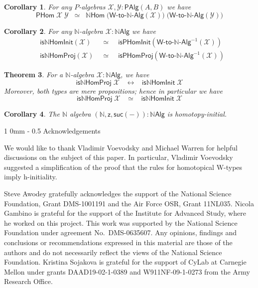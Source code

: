 \documentclass[10pt,a4paper,oneside,reqno]{amsart}
\makeatletter
\numberwithin{equation}{section}
\renewcommand{\section}{\@startsection
  {section}%
   {1}%
  {0mm}%
   {-\baselineskip}%
  {0.5\baselineskip}%
   {\Large\bfseries}}%
\theoremstyle{mythm}
\newtheorem{theorem}{Theorem}[section]
\newtheorem{corollary}[theorem]{Corollary}
\theoremstyle{mydef}
\theoremstyle{myrmk}
\newcommand{\nat}{\ensuremath{\mathbb{N}}}
\newcommand{\suc}{\mathsf{suc}}
\newcommand{\W}{\mathsf{W}}
\newcommand{\NatAlg}{\nat\mathsf{Alg}}
\newcommand{\NatHom}{\nat\mathsf{Hom}}
\newcommand{\IsNatHInit}{\mathsf{is}\nat\mathsf{HomInit}}
\newcommand{\IsNatHProj}{\mathsf{is}\nat\mathsf{HomProj}}
\newcommand{\WAlgToNatAlg}{\W\text{-}\mathsf{to}\text{-}\nat\text{-}\mathsf{Alg}}
\newcommand{\WAlg}{\mathsf{PAlg}}
\newcommand{\WHom}{\mathsf{PHom}}
\newcommand{\IsWHInit}{\mathsf{isPHomInit}}
\newcommand{\IsWHProj}{\mathsf{isPHomProj}}
\newcommand{\X}{\mathcal{X}}
\newcommand{\Y}{\mathcal{Y}}
\newcommand{\z}{\mathsf{z}}
\makeatother
\begin{document}
\begin{corollary}
For any $P$-algebras $\X,\Y : \WAlg(A,B)$ we have
\[ \WHom \; \X \; \Y \;\; \simeq \;\; \NatHom \; \big(\WAlgToNatAlg(\X)\big) \; \big(\WAlgToNatAlg(\Y)\big) \]
\end{corollary}

\begin{corollary}
For any $\nat$-algebra $\X : \NatAlg$ we have
\begin{alignat*}{4}
& \IsNatHInit(\X) \;\; & \simeq \;\; & \IsWHInit(\WAlgToNatAlg^{-1}(\X)) \\
& \IsNatHProj(\X) \;\; & \simeq \;\; & \IsWHProj(\WAlgToNatAlg^{-1}(\X))
\end{alignat*}
\end{corollary}

\begin{theorem}\label{lem:WMainInternal}
For a $\nat$-algebra $\X : \NatAlg$, we have
\[ \IsNatHProj \; \X \;\;\; \leftrightarrow \;\;\; \IsNatHInit \; \X \]
Moreover, both types are mere propositions; hence in particular we have
\[ \IsNatHProj \; \X \;\;\; \simeq \;\;\; \IsNatHInit \; \X \]
\end{theorem}

\begin{corollary}\label{lem:NatInitInt}
The $\nat$ algebra $(\nat,\z,\suc(-)) : \NatAlg$ is homotopy-initial.
\end{corollary}

\section{Acknowledgements}

We would like to thank Vladimir Voevodsky and Michael Warren for helpful discussions
on the subject of this paper. In particular, Vladimir Voevodsky suggested a simplification of the 
proof that the rules for homotopical W-types imply h-initiality.

Steve Awodey gratefully acknowledges the support of the National Science Foundation, Grant DMS-1001191
 and the Air Force OSR, Grant 11NL035.
Nicola Gambino is grateful for the support of the Institute for Advanced Study, where
he worked on this project. This work was supported by the National Science Foundation 
under agreement No.\ DMS-0635607. Any opinions, findings and conclusions or recommendations
expressed in this material are those of the authors and do not necessarily reflect the views of
the National Science Foundation.
Kristina Sojakova is grateful for the support of CyLab at Carnegie
Mellon under grants DAAD19-02-1-0389 and W911NF-09-1-0273 from the Army
Research Office.
\end{document}
